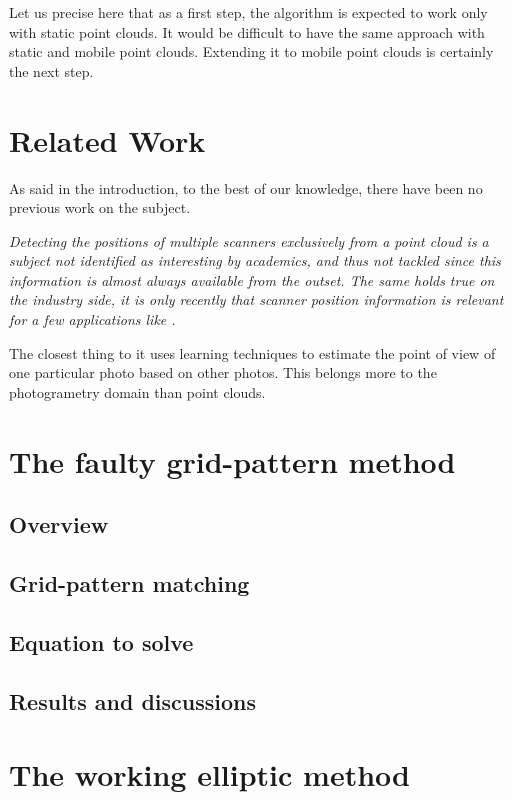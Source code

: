 Let us precise here that as a first step, the algorithm is expected to work only with static point clouds. It would be difficult to have the same approach with static and mobile point clouds. Extending it to mobile point clouds is certainly the next step.


\section{Related Work}
As said in the introduction, to the best of our knowledge, there have been no previous work on the subject.

\emph{Detecting the positions of multiple scanners exclusively from a point cloud is a subject not identified as interesting by academics, and thus not tackled since this information is almost always available from the outset. The same holds true on the industry side, it is only recently that scanner position information is relevant for a few applications like \CC.}

The closest thing to it uses learning techniques to estimate the point of view of one particular photo based on other photos. This belongs more to the photogrametry domain than point clouds.


\section{The faulty grid-pattern method}


\subsection{Overview}


\subsection{Grid-pattern matching}


\subsection{Equation to solve}


\subsection{Results and discussions}



\section{The working elliptic method}


